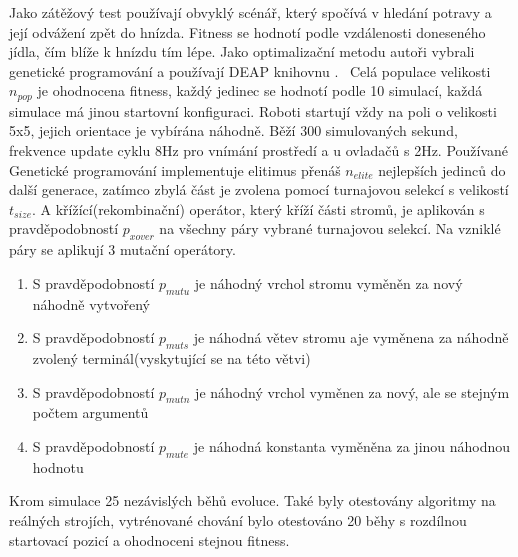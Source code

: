 Jako zátěžový test používají obvyklý scénář, který spočívá v hledání potravy a její odvážení zpět do hnízda. Fitness se hodnotí podle vzdálenosti doneseného jídla, čím blíže k hnízdu tím lépe. Jako optimalizační metodu autoři vybrali genetické programování a používají DEAP knihovnu \cite{deap}. \
Celá populace velikosti $n_{pop}$ je ohodnocena fitness, každý jedinec se hodnotí podle 10 simulací, každá simulace má jinou startovní konfiguraci. Roboti startují vždy na poli o velikosti 5x5, jejich orientace je vybírána náhodně. Běží 300 simulovaných sekund, frekvence update cyklu 8Hz pro vnímání prostředí a u ovladačů s 2Hz. Používané Genetické programování implementuje elitimus přenáš $n_{elite}$ nejlepších jedinců do další generace, zatímco zbylá část je zvolena pomocí turnajovou selekcí s velikostí $t_{size}$. A křížící(rekombinační) operátor, který kříží části stromů, je aplikován s pravděpodobností $p_{xover}$ na všechny páry vybrané turnajovou selekcí. Na vzniklé páry se aplikují 3 mutační operátory. \par
\begin{enumerate}
    \item S pravděpodobností $p_{mutu}$ je náhodný vrchol stromu vyměněn za nový náhodně vytvořený 
    \item S pravděpodobností $p_{muts}$ je náhodná větev stromu aje  vyměnena za náhodně zvolený terminál(vyskytující se na této větvi)
    \item S pravděpodobností $p_{mutn}$ je náhodný vrchol vyměnen za nový, ale se stejným počtem argumentů
    \item S pravděpodobností $p_{mute}$ je náhodná konstanta vyměněna za jinou náhodnou hodnotu
\end{enumerate}
Krom simulace 25 nezávislých běhů evoluce. Také byly otestovány algoritmy na reálných strojích, vytrénované chování bylo otestováno 20 běhy s rozdílnou startovací pozicí a ohodnoceni stejnou fitness. 
\par 

